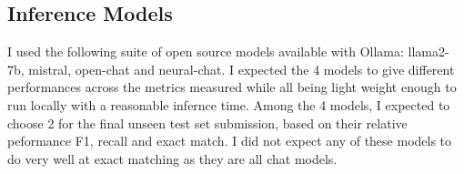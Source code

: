 \documentclass[11pt]{article}
\begin{document}
\subsection{Inference Models}
I used the following suite of open source models available with Ollama: llama2-7b, mistral, open-chat and neural-chat. I expected the 4 models to give different performances across the metrics measured while all being light weight enough to run locally with a reasonable infernce time.
Among the 4 models, I expected to choose 2 for the final unseen test set submission, based on their relative peformance F1, recall and exact match. I did not expect any of these models to do very well at exact matching as they are all chat models.






\end{document}
